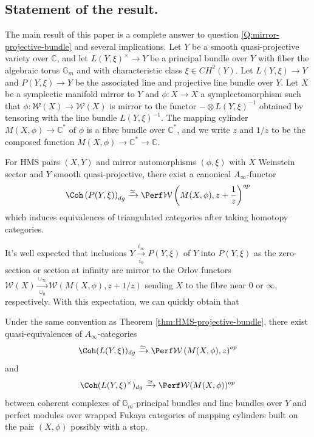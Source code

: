 \subsection{Statement of the result.} The main result of this paper is a complete answer to question \ref{Q:mirror-projective-bundle} and several implications. Let $Y$ be a smooth quasi-projective variety over $\mathbb{C}$, and let $L(Y,\xi)^{\times}\to Y$ be a principal bundle over $Y$ with fiber the algebraic torus $\mathbb{G}_m$ and with characteristic class $\xi\in CH^2 (Y)$. Let $L(Y,\xi)\to Y$ and $P(Y,\xi)\to Y$ be the associated line and projective line bundle over $Y$. Let $X$ be a symplectic manifold mirror to $Y$ and $\phi\colon X\to X$ a symplectomorphism such that $\phi\colon\mathcal{W} (X)\to\mathcal{W} (X)$ is mirror to the functor $-\otimes L(Y,\xi)^{-1}$ obtained by tensoring with the line bundle $L(Y,\xi)^{-1}$. The mapping cylinder $M(X,\phi)\to\mathbb{C}^{\ast}$ of $\phi$ is a fibre bundle over $\mathbb{C}^{\ast}$, and we write $z$ and $1/z$ to be the composed function $M(X,\phi)\to\mathbb{C}^{\ast}\to\mathbb{C}$.
\begin{thm}\label{thm:HMS-projective-bundle}
    For HMS pairs $(X,Y)$ and mirror automorphisms $(\phi,\xi)$ with $X$ Weinstein sector and $Y$ smooth quasi-projective, there exist a canonical $A_{\infty}$-functor\[
        \Coh\left(P(Y,\xi)\right)_{dg}\xrightarrow{\simeq}\Perf\mathcal{W}\left(M(X,\phi),z+\dfrac{1}{z}\right)^{op}
    \]
    which induces equivalences of triangulated categories after taking homotopy categories.
\end{thm}
It's well expected that inclusions $Y\xrightarrow[i_0]{i_{\infty}} P(Y,\xi)$ of $Y$ into $P(Y,\xi)$ as the zero-section or section at infinity are mirror to the Orlov functors $\mathcal{W} (X)\xrightarrow[\cup_0]{\cup_{\infty}}\mathcal{W} (M(X,\phi),z+1/z)$ sending $X$ to the fibre near $0$ or $\infty$, respectively. With this expectation, we can quickly obtain that 
\begin{crl}\label{crl:mirror-symmetry-line-principal-bundles}
    Under the same convention as Theorem \ref{thm:HMS-projective-bundle}, there exist quasi-equivalences of $A_{\infty}$-categories \[
        \Coh (L(Y,\xi))_{dg}\xrightarrow{\simeq}\Perf\mathcal{W}\left(M(X,\phi),z\right)^{op}
    \]and\[
        \Coh (L(Y,\xi)^{\times})_{dg}\xrightarrow{\simeq}\Perf\mathcal{W} (M(X,\phi))^{op}
        \]between coherent complexes of $\mathbb{G}_m$-principal bundles and line bundles over $Y$ and perfect modules over wrapped Fukaya categories of mapping cylinders built on the pair $(X,\phi)$ possibly with a stop.
\end{crl}
